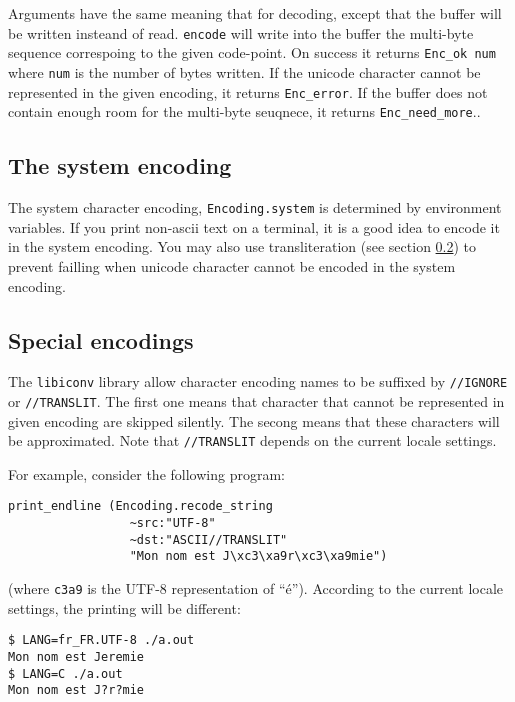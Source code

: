 \documentclass{article}
\begin{document}
Arguments have the same meaning that for decoding, except that the
buffer will be written insteand of read. \texttt{encode} will write
into the buffer the multi-byte sequence correspoing to the given
code-point. On success it returns \texttt{Enc\_ok num} where
\texttt{num} is the number of bytes written. If the unicode character
cannot be represented in the given encoding, it returns
\texttt{Enc\_error}. If the buffer does not contain enough room for
the multi-byte seuqnece, it returns \texttt{Enc\_need\_more}..

\subsection{The system encoding}

The system character encoding, \texttt{Encoding.system} is determined
by environment variables. If you print non-ascii text on a terminal,
it is a good idea to encode it in the system encoding. You may also
use transliteration (see section \ref{special-encoding}) to prevent
failling when unicode character cannot be encoded in the system
encoding.

\subsection{Special encodings}
\label{special-encoding}

The \texttt{libiconv} library allow character encoding names to be
suffixed by \texttt{//IGNORE} or \texttt{//TRANSLIT}. The first one
means that character that cannot be represented in given encoding are
skipped silently. The secong means that these characters will be
approximated. Note that \texttt{//TRANSLIT} depends on the current
locale settings.

For example, consider the following program:

\lstset{language=[Objective]Caml}\begin{lstlisting}
print_endline (Encoding.recode_string
                 ~src:"UTF-8"
                 ~dst:"ASCII//TRANSLIT"
                 "Mon nom est J\xc3\xa9r\xc3\xa9mie")
\end{lstlisting}

(where \texttt{c3a9} is the UTF-8 representation of
``é''). According to the current locale settings, the printing will be
different:

\lstset{language=bash}\begin{lstlisting}
$ LANG=fr_FR.UTF-8 ./a.out
Mon nom est Jeremie
$ LANG=C ./a.out
Mon nom est J?r?mie
\end{lstlisting}
\end{document}
